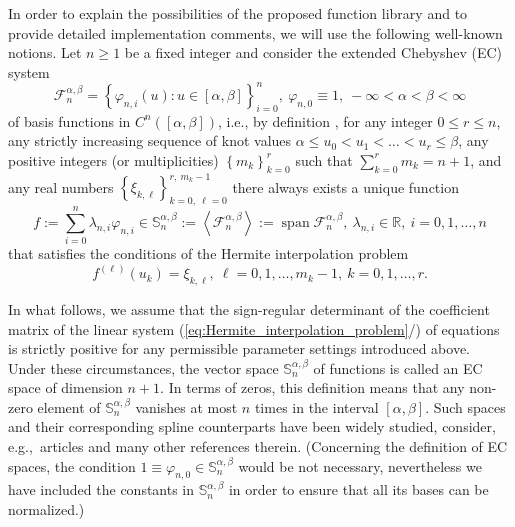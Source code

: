 \documentclass[b5paper, twosided]{book}
\DeclareRobustCommand{\mref}[1]{\ref{#1}{\relsize{-1}/\pageref{#1}}}
\begin{document}
In order to explain the possibilities of the proposed function library and to provide detailed implementation comments, we will use the following well-known notions. Let $n\geq1$ be a fixed integer and consider the extended Chebyshev (EC) system%
\begin{equation}
    \mathcal{F}_{n}^{\alpha,\beta}=\left\{  \varphi
    _{n,i}\left(  u\right)  :u\in\left[  \alpha,\beta\right]  \right\}  _{i=0}%
    ^{n},~\varphi_{n,0}	\equiv 1,~-\infty<\alpha<\beta<\infty\label{eq:ordinary_basis}%
\end{equation}
of basis functions in $C^{n}\left(  \left[  \alpha,\beta\right]  \right)  $,
i.e., by definition \citep{KarlinStudden1966}, for any integer $0\leq r\leq n$, any strictly increasing
sequence of knot values $\alpha\leq u_{0}<u_{1}<\ldots<u_{r}\leq\beta$, any
positive integers (or multiplicities) $\left\{  m_{k}\right\}  _{k=0}^{r}$
such that $\sum_{k=0}^{r}m_{k}=n+1$, and any real numbers $\left\{
\xi_{k,\ell}\right\}  _{k=0,~\ell=0}^{r,~m_{k}-1}$ there always exists a
unique function
\begin{equation}
    f:=\sum_{i=0}^{n}\lambda_{n,i}\varphi_{n,i}\in\mathbb{S}_{n}^{\alpha,\beta}:=\left\langle\mathcal{F}_{n}^{\alpha,\beta
    }\right\rangle:=\operatorname{span}\mathcal{F}_{n}^{\alpha,\beta},~\lambda_{n,i}\in\mathbb{R},~i=0,1,\ldots,n \label{eq:unique_solution}%
\end{equation}
that satisfies the conditions of the Hermite interpolation problem%
\begin{equation}
    f^{\left(  \ell\right)  }\left(  u_{k}\right)  =\xi_{k,\ell},~\ell
    =0,1,\ldots,m_{k}-1,~k=0,1,\ldots,r. \label{eq:Hermite_interpolation_problem}%
\end{equation}

In what follows, we assume that the sign-regular determinant of the coefficient
matrix of the linear system (\mref{eq:Hermite_interpolation_problem}) of
equations is strictly positive for any permissible parameter settings introduced above.
Under these circumstances, the vector space $\mathbb{S}_{n}^{\alpha,\beta}$ of functions is
called an EC space of dimension $n+1$. In terms of zeros, this
definition means that any non-zero element of $\mathbb{S}_{n}^{\alpha,\beta}$
vanishes at most $n$ times in the interval $\left[  \alpha,\beta\right]  $. Such spaces and their corresponding spline counterparts have been widely studied, consider, e.g.,\ articles \citep{Schumaker2007, Lyche1985,Pottmann1993,MazureLaurent1998,MainarPena1999,MainarPenaSanchez2001,LuWangYang2002,CarnicerMainarPena2004,MainarPena2004,CostantiniLycheManni2005,CarnicerMainarPena2007,MainarPena2010,Roth2015a,Roth2015b} and many other references therein. (Concerning the definition of EC spaces, the condition $1\equiv\varphi_{n,0}\in\mathbb{S}_{n}^{\alpha,\beta}$ would be not necessary, nevertheless we have included the constants in $\mathbb{S}_{n}^{\alpha,\beta}$ in order to ensure that all its bases can be normalized.)
\end{document}
